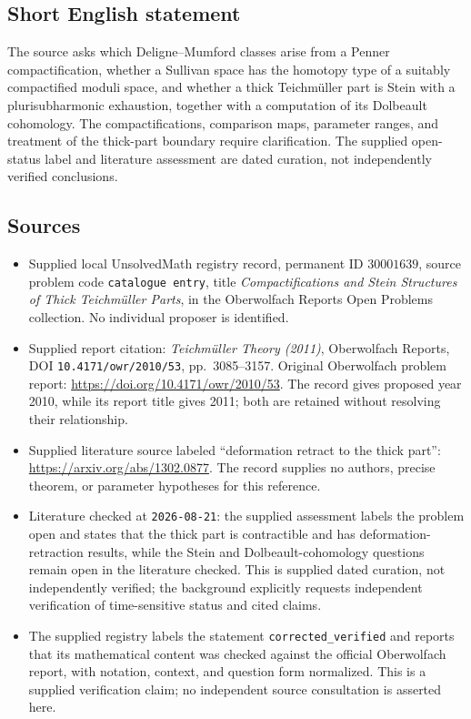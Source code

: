 \documentclass[11pt]{article}
\begin{document}
\subsection{Short English statement}
The source asks which Deligne--Mumford classes arise from a Penner compactification, whether a Sullivan space has the homotopy type of a suitably compactified moduli space, and whether a thick Teichmüller part is Stein with a plurisubharmonic exhaustion, together with a computation of its Dolbeault cohomology. The compactifications, comparison maps, parameter ranges, and treatment of the thick-part boundary require clarification. The supplied open-status label and literature assessment are dated curation, not independently verified conclusions.
\subsection{Sources}
\begin{itemize}
\item Supplied local UnsolvedMath registry record, permanent ID \(30001639\), source problem code \texttt{catalogue entry}, title \emph{Compactifications and Stein Structures of Thick Teichmüller Parts}, in the Oberwolfach Reports Open Problems collection. No individual proposer is identified.
\item Supplied report citation: \emph{Teichmüller Theory (2011)}, Oberwolfach Reports, DOI \texttt{10.4171/owr/2010/53}, pp.\ 3085--3157. Original Oberwolfach problem report: \url{https://doi.org/10.4171/owr/2010/53}. The record gives proposed year 2010, while its report title gives 2011; both are retained without resolving their relationship.
\item Supplied literature source labeled ``deformation retract to the thick part'': \url{https://arxiv.org/abs/1302.0877}. The record supplies no authors, precise theorem, or parameter hypotheses for this reference.
\item Literature checked at \texttt{2026-08-21}: the supplied assessment labels the problem open and states that the thick part is contractible and has deformation-retraction results, while the Stein and Dolbeault-cohomology questions remain open in the literature checked. This is supplied dated curation, not independently verified; the background explicitly requests independent verification of time-sensitive status and cited claims.
\item The supplied registry labels the statement \texttt{corrected\_verified} and reports that its mathematical content was checked against the official Oberwolfach report, with notation, context, and question form normalized. This is a supplied verification claim; no independent source consultation is asserted here.
\end{itemize}
\end{document}
